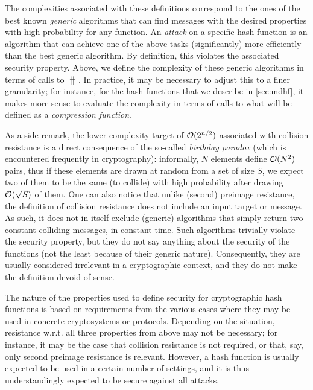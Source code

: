 The complexities associated with these definitions correspond to the ones of the best known \emph{generic} algorithms that can find messages with the desired
properties with high probability for any function. An \emph{attack} on a specific hash function is an algorithm that can achieve one of the above tasks (significantly)
more efficiently than the best generic algorithm. By definition, this violates the associated security property.
Above, we define the complexity of these generic algorithms in terms of calls to $\hash$. In practice, it may be necessary to adjust
this to a finer granularity; for instance, for the \merkdam hash functions that we describe in \autoref{sec:mdhf}, it makes more sense to evaluate the complexity
in terms of calls to what will be defined as a \emph{compression function}.

As a side remark, the lower complexity target of $\operatorname{\mathcal{O}}(2^{n/2})$ associated with collision resistance is a direct consequence of the so-called \emph{birthday paradox} (which
is encountered frequently in cryptography): informally,
$N$ elements define $\operatorname{\mathcal{O}}(N^2)$ pairs, thus if these elements are drawn at random from a set of size $S$, we expect two of them to be the same (\ie to collide)
with high probability after drawing $\operatorname{\mathcal{O}}(\sqrt{S})$ of them.
One can also notice that unlike (second) preimage resistance, the definition of collision resistance does not include an input target or message. As such, it does not in itself
exclude (generic) algorithms that simply return two constant colliding messages, in constant time. Such algorithms trivially violate the security property, but
they do not say anything about the security of the functions (not the least because of their generic nature). Consequently, they are usually considered irrelevant in a cryptographic context, and they do not make
the definition devoid of sense.

\bigskip

The nature of the properties used to define security for cryptographic hash functions is based on requirements from the various cases where they may be used in concrete cryptosystems or protocols.
Depending on the situation, resistance w.r.t. all three properties from above may not be necessary; for instance, it may be the case that collision resistance is not required, or that, say, only second preimage resistance
is relevant. However, a hash function is usually expected to be used in a certain number of settings, and it is thus understandingly expected to be secure against all attacks.

